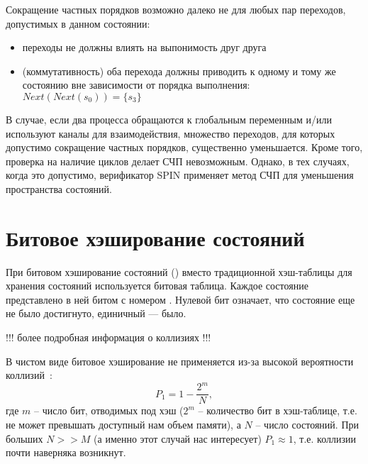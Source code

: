 
Сокращение частных порядков возможно далеко не для любых пар
переходов, допустимых в данном состоянии:

\begin{itemize}
\item переходы не должны влиять на выпонимость друг друга
\item (коммутативность) оба перехода должны приводить к одному и тому же состоянию
  вне зависимости от порядка выполнения: $Next(Next(s_0)) = \{ s_3 \}$
\end{itemize}

В случае, если два процесса обращаются к глобальным переменным и/или
используют каналы для взаимодействия, множество переходов, для которых
допустимо сокращение частных порядков, существенно уменьшается. Кроме
того, проверка на наличие циклов делает СЧП невозможным. Однако, в тех
случаях, когда это допустимо, верификатор SPIN применяет метод СЧП для
уменьшения пространства состояний.


\section{Битовое хэширование состояний}
\label{sec:bit-hashing}

При битовом хэширование состояний () вместо традиционной
хэш-таблицы для хранения состояний используется битовая таблица. Каждое состояние 
представлено в ней битом с номером . Нулевой бит означает, что состояние
еще не было достигнуто, единичный — было.

!!! более подробная информация о коллизиях !!!

В чистом виде битовое хэширование не применяется из-за высокой
вероятности коллизий~\cite{BitHash1}:
\begin{equation}
  \label{eq:bithash-single-coll}
  P_1 = 1 - \frac{2^m}{N},
\end{equation}
где $m$ -- число бит, отводимых под хэш ($2^m$ -- количество бит в
хэш-таблице, т.е. не может превышать доступный нам объем памяти), а
$N$ -- число состояний. При больших $N >> M$ (а именно этот случай нас
интересует) $P_1 \approx 1$, т.е. коллизии почти наверняка возникнут.

